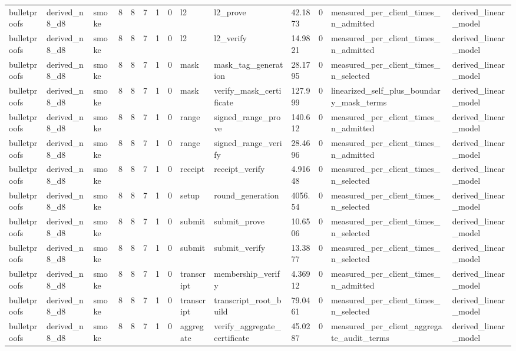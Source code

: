 \begin{table}[t]
\begin{tabular}{llllllllllllll}
bulletproofs & derived\_n8\_d8 & smoke & 8 & 8 & 7 & 1 & 0 & l2 & l2\_prove & 42.1873 & 0 & measured\_per\_client\_times\_n\_admitted & derived\_linear\_model \\
bulletproofs & derived\_n8\_d8 & smoke & 8 & 8 & 7 & 1 & 0 & l2 & l2\_verify & 14.9821 & 0 & measured\_per\_client\_times\_n\_admitted & derived\_linear\_model \\
bulletproofs & derived\_n8\_d8 & smoke & 8 & 8 & 7 & 1 & 0 & mask & mask\_tag\_generation & 28.1795 & 0 & measured\_per\_client\_times\_n\_selected & derived\_linear\_model \\
bulletproofs & derived\_n8\_d8 & smoke & 8 & 8 & 7 & 1 & 0 & mask & verify\_mask\_certificate & 127.999 & 0 & linearized\_self\_plus\_boundary\_mask\_terms & derived\_linear\_model \\
bulletproofs & derived\_n8\_d8 & smoke & 8 & 8 & 7 & 1 & 0 & range & signed\_range\_prove & 140.612 & 0 & measured\_per\_client\_times\_n\_admitted & derived\_linear\_model \\
bulletproofs & derived\_n8\_d8 & smoke & 8 & 8 & 7 & 1 & 0 & range & signed\_range\_verify & 28.4696 & 0 & measured\_per\_client\_times\_n\_admitted & derived\_linear\_model \\
bulletproofs & derived\_n8\_d8 & smoke & 8 & 8 & 7 & 1 & 0 & receipt & receipt\_verify & 4.91648 & 0 & measured\_per\_client\_times\_n\_selected & derived\_linear\_model \\
bulletproofs & derived\_n8\_d8 & smoke & 8 & 8 & 7 & 1 & 0 & setup & round\_generation & 4056.54 & 0 & measured\_per\_client\_times\_n\_selected & derived\_linear\_model \\
bulletproofs & derived\_n8\_d8 & smoke & 8 & 8 & 7 & 1 & 0 & submit & submit\_prove & 10.6506 & 0 & measured\_per\_client\_times\_n\_selected & derived\_linear\_model \\
bulletproofs & derived\_n8\_d8 & smoke & 8 & 8 & 7 & 1 & 0 & submit & submit\_verify & 13.3877 & 0 & measured\_per\_client\_times\_n\_selected & derived\_linear\_model \\
bulletproofs & derived\_n8\_d8 & smoke & 8 & 8 & 7 & 1 & 0 & transcript & membership\_verify & 4.36912 & 0 & measured\_per\_client\_times\_n\_admitted & derived\_linear\_model \\
bulletproofs & derived\_n8\_d8 & smoke & 8 & 8 & 7 & 1 & 0 & transcript & transcript\_root\_build & 79.0461 & 0 & measured\_per\_client\_times\_n\_selected & derived\_linear\_model \\
bulletproofs & derived\_n8\_d8 & smoke & 8 & 8 & 7 & 1 & 0 & aggregate & verify\_aggregate\_certificate & 45.0287 & 0 & measured\_per\_client\_aggregate\_audit\_terms & derived\_linear\_model \\

\end{tabular}
\end{table}
